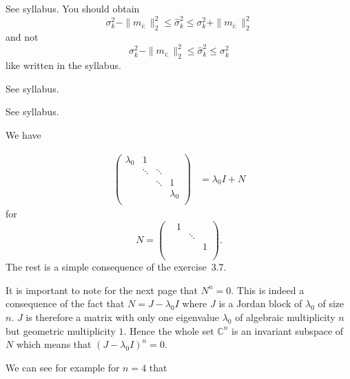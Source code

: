 \begin{solution}
  See syllabus.
  You should obtain
  \[ \sigma_k^2 - \|m_{i:}\|_2^2 \leq \hat{\sigma}_k^2 \leq \sigma_k^2 + \|m_{i:}\|_2^2 \]
  and not
  \[ \sigma_k^2 - \|m_{i:}\|_2^2 \leq \hat{\sigma}_k^2 \leq \sigma_k^2 \]
  like written in the syllabus.
\end{solution}

\begin{solution}
  See syllabus.
\end{solution}

\begin{solution}
  See syllabus.
\end{solution}

\begin{solution}
  We have

  \begin{align*}
    \begin{pmatrix}
      \lambda_0 & 1      &        & \\
                & \ddots & \ddots & \\
                &        & \ddots & 1\\
                &        &        & \lambda_0\\
    \end{pmatrix}
    & =
    \lambda_0 I + N
  \end{align*}
  for
  \[
    N =
    \begin{pmatrix}
      & 1 &        & \\
      &   & \ddots & \\
      &   &        & 1\\
      &   &        & \\
    \end{pmatrix}.
  \]
  The rest is a simple consequence of the exercise~3.7.

  It is important to note for the next page that $N^n = 0$.
  This is indeed a consequence of the fact that $N = J - \lambda_0I$
  where $J$ is a Jordan block of $\lambda_0$ of size $n$.
  $J$ is therefore a matrix with only one eigenvalue $\lambda_0$
  of algebraic multiplicity $n$ but geometric multiplicity $1$.
  Hence the whole set $\mathbb{C}^n$ is an invariant subspace of $N$
  which means that $(J - \lambda_0I)^n = 0$.

  We can see for example for $n = 4$ that


\end{solution}
